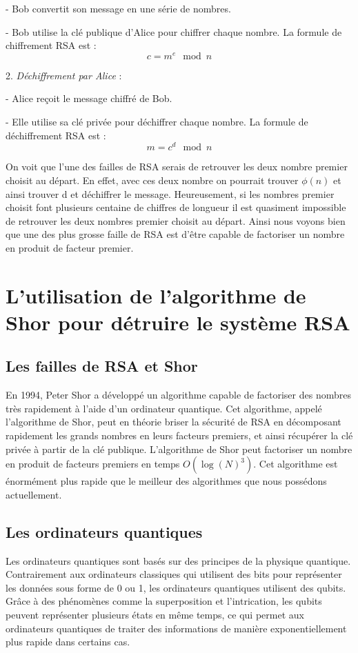 \documentclass[a4paper,12pt]{article}
\begin{document}
- Bob convertit son message en une série de nombres. 
   
   - Bob utilise la clé publique d'Alice pour chiffrer chaque nombre. La formule de chiffrement RSA est :
   \[ c = m^e \mod n \]
   
2. \textit{Déchiffrement par Alice} :
   
- Alice reçoit le message chiffré de Bob.
   
   - Elle utilise sa clé privée pour déchiffrer chaque nombre. La formule de déchiffrement RSA est :
   \[ m = c^d \mod n \]


On voit que l'une des failles de RSA serais de retrouver les deux nombre premier choisit au départ. En effet, avec ces deux nombre on pourrait trouver \(\phi(n)\) et ainsi trouver d et déchiffrer le message. Heureusement, si les nombres premier choisit font plusieurs centaine de chiffres de longueur il est quasiment impossible de retrouver les deux nombres premier choisit au départ. Ainsi nous voyons bien que une des plus grosse faille de RSA est d'être capable de factoriser un nombre en produit de facteur premier.

\section{L'utilisation de l'algorithme de Shor pour détruire le système RSA}

\subsection{Les failles de RSA et Shor}
En 1994, Peter Shor a développé un algorithme capable de factoriser des nombres très rapidement à l'aide d'un ordinateur quantique. Cet algorithme, appelé l'algorithme de Shor, peut en théorie briser la sécurité de RSA en décomposant rapidement les grands nombres en leurs facteurs premiers, et ainsi récupérer la clé privée à partir de la clé publique.
L'algorithme de Shor peut factoriser un nombre en produit de facteurs premiers en temps \(O(\log(N)^3)\). Cet algorithme est énormément plus rapide que le meilleur des algorithmes que nous possédons actuellement.

\subsection{Les ordinateurs quantiques}
Les ordinateurs quantiques sont basés sur des principes de la physique quantique. Contrairement aux ordinateurs classiques qui utilisent des bits pour représenter les données sous forme de 0 ou 1, les ordinateurs quantiques utilisent des qubits. Grâce à des phénomènes comme la superposition et l'intrication, les qubits peuvent représenter plusieurs états en même temps, ce qui permet aux ordinateurs quantiques de traiter des informations de manière exponentiellement plus rapide dans certains cas.
\end{document}
